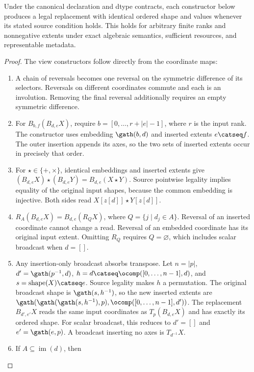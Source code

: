 \begin{lemma}
\label{lem:certified-extensions}
Under the canonical declaration and dtype contracts, each constructor
below produces a legal replacement with identical ordered shape and values
whenever its stated source condition holds. This holds for arbitrary finite
ranks and nonnegative extents under exact algebraic semantics, sufficient
resources, and representable metadata.
\end{lemma}
\begin{proof}
The view constructors follow directly from the coordinate maps:
\begin{enumerate}
\item A chain of reversals becomes one reversal on the symmetric difference
of its selectors. Reversals on different coordinates commute and each is an
involution. Removing the final reversal additionally requires an empty
symmetric difference.
\item For $B_{b,f}(B_{d,e}X)$, require $b=[0,\ldots,r+|e|-1]$, where $r$ is
the input rank. The constructor uses embedding $\gath(b,d)$ and inserted
extents $e\catseq f$. The outer insertion appends its axes, so the two sets
of inserted extents occur in precisely that order.
\item For $\star\in\{+,\times\}$, identical embeddings and inserted extents
give $(B_{d,e}X)\star(B_{d,e}Y)=B_{d,e}(X\star Y)$. Source pointwise
legality implies equality of the original input shapes, because the common
embedding is injective. Both sides read $X[z[d]]\star Y[z[d]]$.
\item $R_A(B_{d,e}X)=B_{d,e}(R_QX)$, where
$Q=\{j\mid d_j\in A\}$. Reversal of an inserted coordinate cannot change
a read. Reversal of an embedded coordinate has its original input extent.
Omitting $R_Q$ requires $Q=\varnothing$, which includes scalar broadcast
when $d=[]$.
\item Any insertion-only broadcast absorbs transpose. Let $n=|p|$,
$d'=\gath(p^{-1},d)$, $h=d\catseq\ocomp([0,\ldots,n-1],d)$,
and $s=\operatorname{shape}(X)\catseq e$. Source legality makes $h$ a
permutation. The original broadcast shape is $\gath(s,h^{-1})$, so the
new inserted extents are
$\gath(\gath(\gath(s,h^{-1}),p),\ocomp([0,\ldots,n-1],d'))$.
The replacement $B_{d',e'}X$ reads the same input coordinates as
$T_p(B_{d,e}X)$ and has exactly its ordered shape. For scalar broadcast,
this reduces to $d'=[]$ and $e'=\gath(e,p)$.
A broadcast inserting no axes is $T_{d^{-1}}X$.
\item If $A\subseteq\operatorname{im}(d)$, then

\end{enumerate}
\end{proof}
